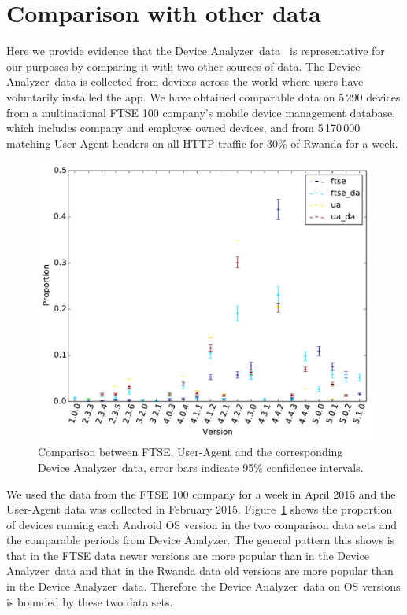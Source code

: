 \documentclass{sig-alternate-2013}
\let\OldTodo\todo
\renewcommand{\todo}{\OldTodo[inline]}
\newcommand{\todolater}[1]{}%
\newcommand{\da}{Device Analyzer}
\begin{document}
\section{Comparison with other data}\label{sec:representative}
Here we provide evidence that the \da\ data~\cite{Wagner2013} is representative for our purposes by comparing it with two other sources of data.
The \da\ data is collected from devices across the world where users have voluntarily installed the app.
We have obtained comparable data on 5\,290 devices from a multinational FTSE 100 company's mobile device management database, which includes company and employee owned devices, and from 5\,170\,000 matching User-Agent headers on all HTTP traffic for 30\% of Rwanda for a week.
\todo{citation for Rwanda dataset}
\begin{figure}
\centering
\includegraphics[width=\columnwidth]{figures/dists}
\caption{Comparison between FTSE, User-Agent and the corresponding \da\ data, error bars indicate 95\% confidence intervals.}
\label{fig:dists}
\end{figure}
We used the data from the FTSE 100 company for a week in April 2015 and the User-Agent data was collected in February 2015. %
Figure~\ref{fig:dists} shows the proportion of devices running each Android OS version in the two comparison data sets and the comparable periods from \da.
The general pattern this shows is that in the FTSE data newer versions are more popular than in the \da\ data and that in the Rwanda data old versions are more popular than in the \da\ data.
Therefore the \da\ data on OS versions is bounded by these two data sets.
\todolater{Can we quantify this?}
\end{document}
